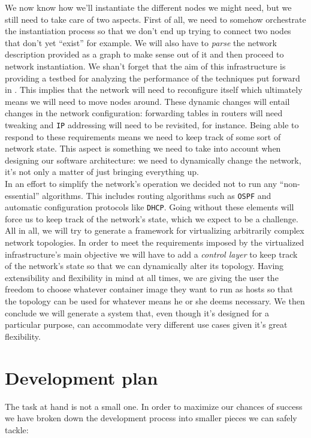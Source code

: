 \documentclass[12pt]{article}
\begin{document}
        We now know how we'll instantiate the different nodes we might need, but we still need to take care of two aspects. First of all, we need to somehow orchestrate the instantiation process so that we don't end up trying to connect two nodes that don't yet ``exist'' for example. We will also have to \textit{parse} the network description provided as a graph to make sense out of it and then proceed to network instantiation. We shan't forget that the aim of this infrastructure is providing a testbed for analyzing the performance of the techniques put forward in \cite{bib:REACT}. This implies that the network will need to reconfigure itself which ultimately means we will need to move nodes around. These dynamic changes will entail changes in the network configuration: forwarding tables in routers will need tweaking and \texttt{IP} addressing will need to be revisited, for instance. Being able to respond to these requirements means we need to keep track of some sort of network state. This aspect is something we need to take into account when designing our software architecture: we need to dynamically change the network, it's not only a matter of just bringing everything up.\\

        In an effort to simplify the network's operation we decided not to run any ``non-essential'' algorithms. This includes routing algorithms such as \texttt{OSPF} and automatic configuration protocols like \texttt{DHCP}. Going without these elements will force us to keep track of the network's state, which we expect to be a challenge.\\

        All in all, we will try to generate a framework for virtualizing arbitrarily complex network topologies. In order to meet the requirements imposed by the virtualized infrastructure's main objective we will have to add a \textit{control layer} to keep track of the network's state so that we can dynamically alter its topology. Having extensibility and flexibility in mind at all times, we are giving the user the freedom to choose whatever container image they want to run as hosts so that the topology can be used for whatever means he or she deems necessary. We then conclude we will generate a system that, even though it's designed for a particular purpose, can accommodate very different use cases given it's great flexibility.\\

    \section{Development plan}
        The task at hand is not a small one. In order to maximize our chances of success we have broken down the development process into smaller pieces we can safely tackle:
\end{document}
